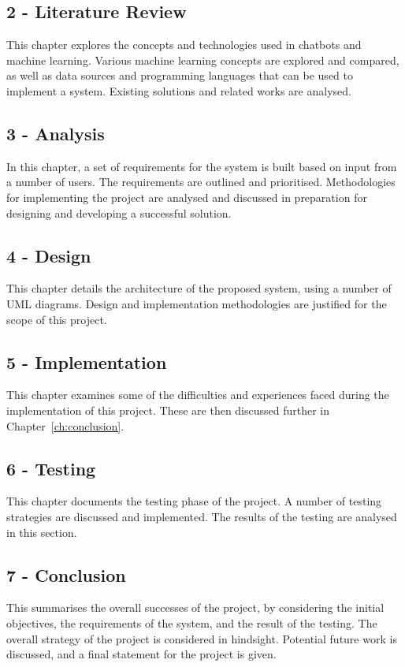 \subsection*{2 - Literature Review}
This chapter explores the concepts and technologies used in chatbots and machine learning. Various machine learning concepts are explored and compared, as well as data sources and programming languages that can be used to implement a system. Existing solutions and related works are analysed.

\subsection*{3 - Analysis}
In this chapter, a set of requirements for the system is built based on input from a number of users. The requirements are outlined and prioritised. Methodologies for implementing the project are analysed and discussed in preparation for designing and developing a successful solution.

\subsection*{4 - Design}
This chapter details the architecture of the proposed system, using a number of UML diagrams. Design and implementation methodologies are justified for the scope of this project.

\subsection*{5 - Implementation}
This chapter examines some of the difficulties and experiences faced during the implementation of this project. These are then discussed further in Chapter~\ref{ch:conclusion}.

\subsection*{6 - Testing}
This chapter documents the testing phase of the project. A number of testing strategies are discussed and implemented. The results of the testing are analysed in this section.

\subsection*{7 - Conclusion}
This summarises the overall successes of the project, by considering the initial objectives, the requirements of the system, and the result of the testing. The overall strategy of the project is considered in hindsight. Potential future work is discussed, and a final statement for the project is given.

